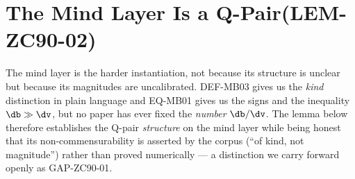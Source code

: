 \documentclass[12pt, a4paper]{article}
\begin{document}
\section{The Mind Layer Is a Q-Pair\quad(LEM-ZC90-02)}
\label{sec:lem02-zc90}

The mind layer is the harder instantiation, not because its structure is
unclear but because its magnitudes are uncalibrated. DEF-MB03 gives us
the \emph{kind} distinction in plain language and EQ-MB01 gives us the
signs and the inequality $\db\gg\dv$, but no paper has ever fixed the
\emph{number} $\db/\dv$. The lemma below therefore establishes the Q-pair
\emph{structure} on the mind layer while being honest that its
non-commensurability is asserted by the corpus (``of kind, not
magnitude'') rather than proved numerically --- a distinction we carry
forward openly as GAP-ZC90-01.
\end{document}
